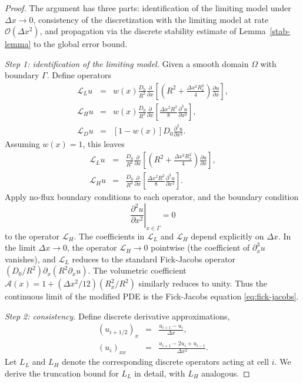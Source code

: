 \documentclass[11pt]{article}
\begin{document}
\begin{proof}
    The argument has three parts: identification of the limiting model under $\Delta x \to 0$, consistency of the discretization with the limiting model at rate $\mathcal{O}(\Delta x^2)$, and propagation via the discrete stability estimate of Lemma~\ref{stab-lemma} to the global error bound.

    \emph{Step 1: identification of the limiting model.}
    Given a smooth domain $\Omega$ with boundary $\Gamma$. Define operators
    \begin{eqnarray}
        \mathcal{L}_L u &=& w(x) \frac{D_0}{R^2} \frac{\partial}{\partial x} \left[ \left( R^2 + \frac{\Delta x^2 R_x^2}{4} \right) \frac{\partial u}{\partial x} \right] ,\\
        \mathcal{L}_H u &=& w(x) \frac{D_0}{R^2} \frac{\partial}{\partial x} \left[\frac{\Delta x^2 R^2}{8} \frac{\partial^3 u}{\partial x^3} \right], \\
        \mathcal{L}_D u &=& [1 - w(x)] D_0 \frac{\partial^2 u}{\partial x^2}.
    \end{eqnarray}
    Assuming $w(x)=1$, this leaves
    \begin{eqnarray}
        \mathcal{L}_L u &=& \frac{D_0}{R^2} \frac{\partial}{\partial x} \left[ \left( R^2 + \frac{\Delta x^2 R_x^2}{4} \right) \frac{\partial u}{\partial x} \right], \\
        \mathcal{L}_H u &=& \frac{D_0}{R^2} \frac{\partial}{\partial x} \left[\frac{\Delta x^2 R^2}{8} \frac{\partial^3 u}{\partial x^3} \right].
    \end{eqnarray}
    Apply no-flux boundary conditions to each operator, and the boundary condition
    \begin{equation}
        \left. \frac{\partial^2 u}{\partial x^2} \right|_{x \in \Gamma} = 0
    \end{equation}
    to the operator $\mathcal{L}_H$. The coefficients in $\mathcal{L}_L$ and $\mathcal{L}_H$ depend explicitly on $\Delta x$. In the limit $\Delta x \to 0$, the operator $\mathcal{L}_H \to 0$ pointwise (the coefficient of $\partial^3_x u$ vanishes), and $\mathcal{L}_L$ reduces to the standard Fick-Jacobs operator $(D_0/R^2)\partial_x(R^2 \partial_x u)$. The volumetric coefficient $\mathcal{A}(x) = 1 + (\Delta x^2/12)(R_x^2/R^2)$ similarly reduces to unity. Thus the continuous limit of the modified PDE is the Fick-Jacobs equation \eqref{eq:fick-jacobs}.

    \emph{Step 2: consistency.}
    Define discrete derivative approximations,
    \begin{eqnarray}
        (u_{i+1/2})_x &=& \frac{u_{i+1} - u_{i}}{\Delta x} ,\\
        (u_i)_{xx} &=& \frac{u_{i+1} - 2u_i + u_{i-1}}{\Delta x^2}.
    \end{eqnarray}
    Let $L_L$ and $L_H$ denote the corresponding discrete operators acting at cell $i$. We derive the truncation bound for $L_L$ in detail, with $L_H$ analogous.


\end{proof}
\end{document}
